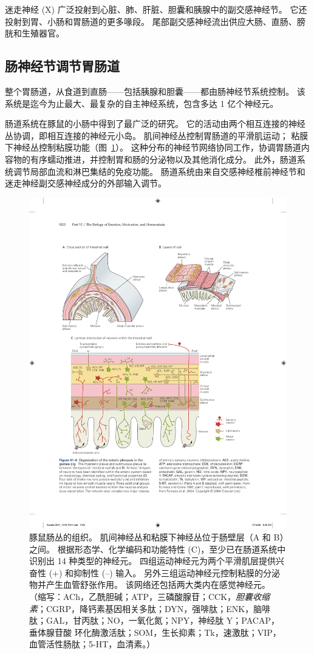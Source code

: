 迷走神经 (X) 广泛投射到心脏、肺、肝脏、胆囊和胰腺中的副交感神经节。
它还投射到胃、小肠和胃肠道的更多喙段。
尾部副交感神经流出供应大肠、直肠、膀胱和生殖器官。



\subsection{肠神经节调节胃肠道}

整个胃肠道，从食道到直肠——包括胰腺和胆囊——都由肠神经节系统控制。
该系统是迄今为止最大、最复杂的自主神经系统，包含多达 1 亿个神经元。


肠道系统在豚鼠的小肠中得到了最广泛的研究。
它的活动由两个相互连接的神经丛协调，即相互连接的神经元小岛。
肌间神经丛控制胃肠道的平滑肌运动；
粘膜下神经丛控制粘膜功能（图~\ref{fig:41_6}）。 
这种分布的神经节网络协同工作，协调胃肠道内容物的有序蠕动推进，并控制胃和肠的分泌物以及其他消化成分。
此外，肠道系统调节局部血流和淋巴集结的免疫功能。
肠道系统由来自交感神经椎前神经节和迷走神经副交感神经成分的外部输入调节。



\begin{figure}[htbp]
	\centering
	\includegraphics[width=0.9\linewidth]{chap41/fig_41_6}
	\caption{豚鼠肠丛的组织。
		肌间神经丛和粘膜下神经丛位于肠壁层（A 和 B）之间。
		根据形态学、化学编码和功能特性 (C)，至少已在肠道系统中识别出 14 种类型的神经元。
		四组运动神经元为两个平滑肌层提供兴奋性 (+) 和抑制性 (–) 输入。
		另外三组运动神经元控制粘膜的分泌物并产生血管舒张作用。
		该网络还包括两大类内在感觉神经元。 
		（缩写：ACh，乙酰胆碱；ATP，三磷酸腺苷；CCK，\textit{胆囊收缩素}；CGRP，降钙素基因相关多肽；DYN，强啡肽；ENK，脑啡肽；GAL，甘丙肽；NO，一氧化氮；NPY，神经肽 Y；PACAP，垂体腺苷酸 环化酶激活肽；SOM，生长抑素；Tk，速激肽；VIP，血管活性肠肽；5-HT，血清素。）\cite{furness1980types}}
	\label{fig:41_6}
\end{figure}



